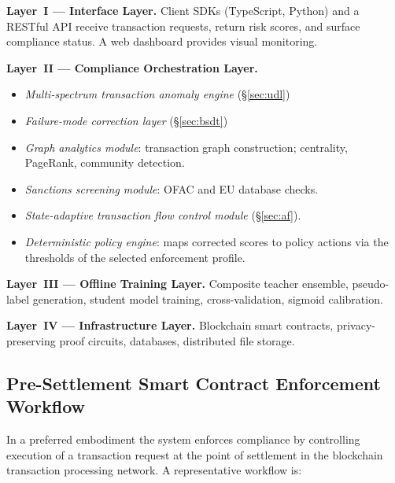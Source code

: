 \documentclass[12pt,a4paper]{article}
\begin{document}
\textbf{Layer~I --- Interface Layer.}
Client SDKs (TypeScript, Python) and a RESTful API receive transaction
requests, return risk scores, and surface compliance status. A web
dashboard provides visual monitoring.

\textbf{Layer~II --- Compliance Orchestration Layer.}
\begin{itemize}
\item \emph{Multi-spectrum transaction anomaly engine} (\S\ref{sec:udl})
\item \emph{Failure-mode correction layer} (\S\ref{sec:bsdt})
\item \emph{Graph analytics module}: transaction graph construction;
centrality, PageRank, community detection.
\item \emph{Sanctions screening module}: OFAC and EU database checks.
\item \emph{State-adaptive transaction flow control module}
(\S\ref{sec:af}).
\item \emph{Deterministic policy engine}: maps corrected scores to policy
actions via the thresholds of the selected enforcement profile.
\end{itemize}

\textbf{Layer~III --- Offline Training Layer.}
Composite teacher ensemble, pseudo-label generation, student model training,
cross-validation, sigmoid calibration.

\textbf{Layer~IV --- Infrastructure Layer.}
Blockchain smart contracts, privacy-preserving proof circuits, databases,
distributed file storage.

\subsection{Pre-Settlement Smart Contract Enforcement Workflow}
\label{sec:workflow}

In a preferred embodiment the system enforces compliance by controlling
execution of a transaction request at the point of settlement in the
blockchain transaction processing network. A representative workflow is:
\end{document}
